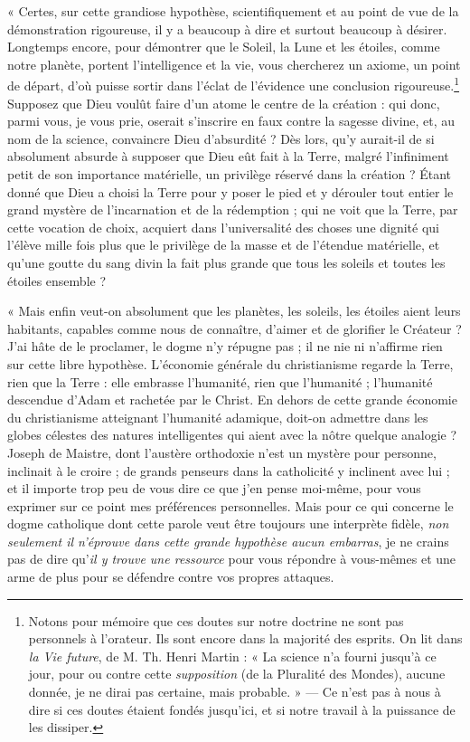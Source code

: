 \documentclass[a4paper, 11pt, oneside]{article}
\begin{document}
« Certes, sur cette grandiose hypothèse, scientifiquement et au point de vue de la démonstration rigoureuse, il y a beaucoup à dire et surtout beaucoup à désirer. Longtemps encore, pour démontrer que le Soleil, la Lune et les étoiles, comme notre planète, portent l'intelligence et la vie, vous chercherez un axiome, un point de départ, d'où puisse sortir dans l'éclat de l'évidence une conclusion rigoureuse.\footnote{Notons pour mémoire que ces doutes sur notre doctrine ne sont pas personnels à l'orateur. Ils sont encore dans la majorité des esprits. On lit dans \emph{la Vie future}, de M. Th. Henri Martin : « La science n'a fourni jusqu'à ce jour, pour ou contre cette \emph{supposition} (de la Pluralité des Mondes), aucune donnée, je ne dirai pas certaine, mais probable. » --- Ce n'est pas à nous à dire si ces doutes étaient fondés jusqu'ici, et si notre travail à la puissance de les dissiper.} Supposez que Dieu voulût faire d'un atome le centre de la création : qui donc, parmi vous, je vous prie, oserait s'inscrire en faux contre la sagesse divine, et, au nom de la science, convaincre Dieu d'absurdité ? Dès lors, qu'y aurait-il de si absolument absurde à supposer que Dieu eût fait à la Terre, malgré l'infiniment petit de son importance matérielle, un privilège réservé dans la création ? Étant donné que Dieu a choisi la Terre pour y poser le pied et y dérouler tout entier le grand mystère de l'incarnation et de la rédemption ; qui ne voit que la Terre, par cette vocation de choix, acquiert dans l'universalité des choses une dignité qui l'élève mille fois plus que le privilège de la masse et de l'étendue matérielle, et qu'une goutte du sang divin la fait plus grande que tous les soleils et toutes les étoiles ensemble ?

« Mais enfin veut-on absolument que les planètes, les soleils, les étoiles aient leurs habitants, capables comme nous de connaître, d'aimer et de glorifier le Créateur ? J'ai hâte de le proclamer, le dogme n'y répugne pas ; il ne nie ni n'affirme rien sur cette libre hypothèse. L'économie générale du christianisme regarde la Terre, rien que la Terre : elle embrasse l'humanité, rien que l'humanité ; l'humanité descendue d'Adam et rachetée par le Christ. En dehors de cette grande économie du christianisme atteignant l'humanité adamique, doit-on admettre dans les globes célestes des natures intelligentes qui aient avec la nôtre quelque analogie ? Joseph de Maistre, dont l'austère orthodoxie n'est un mystère pour personne, inclinait à le croire ; de grands penseurs dans la catholicité y inclinent avec lui ; et il importe trop peu de vous dire ce que j'en pense moi-même, pour vous exprimer sur ce point mes préférences personnelles. Mais pour ce qui concerne le dogme catholique dont cette parole veut être toujours une interprète fidèle, \emph{non seulement il n'éprouve dans cette grande hypothèse aucun embarras}, je ne crains pas de dire qu'\emph{il y trouve une ressource} pour vous répondre à vous-mêmes et une arme de plus pour se défendre contre vos propres attaques.
\end{document}
